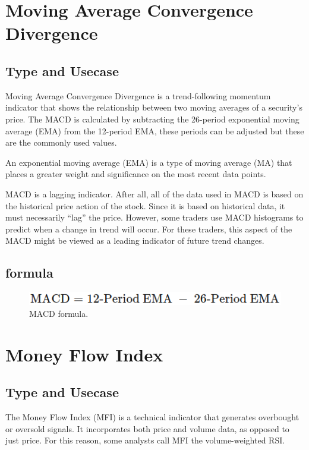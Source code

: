 \documentclass[12pt,a4paper]{article}
\begin{document}
\section{Moving Average Convergence Divergence}

\subsection{Type and Usecase}
Moving Average Convergence Divergence is a trend-following momentum indicator that shows the relationship between two moving averages of a security's price. The MACD is calculated by subtracting the 26-period exponential moving average (EMA) from the 12-period EMA, these periods can be adjusted but these are the commonly used values.

An exponential moving average (EMA) is a type of moving average (MA) that places a greater weight and significance on the most recent data points.

MACD is a lagging indicator. After all, all of the data used in MACD is based on the historical price action of the stock. Since it is based on historical data, it must necessarily “lag” the price. However, some traders use MACD histograms to predict when a change in trend will occur. For these traders, this aspect of the MACD might be viewed as a leading indicator of future trend changes.

\subsection{formula}

\begin{figure}[H]
    \includegraphics[scale=0.7]{../images/MACD.png}
    \caption{MACD formula.}
    \label{fig:MACD}
\end{figure}

\section{Money Flow Index}

\subsection{Type and Usecase}
The Money Flow Index (MFI) is a technical indicator that generates overbought or oversold signals.
It incorporates both price and volume data, as opposed to just price. For this reason, some analysts call MFI the volume-weighted RSI.
\end{document}
